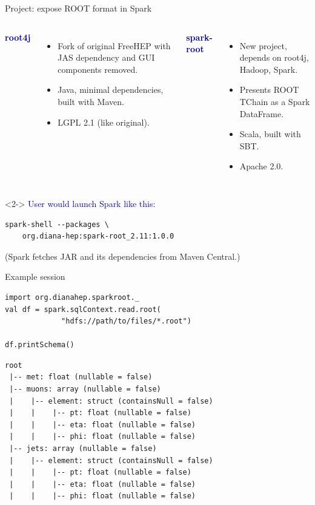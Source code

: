 \documentclass{beamer}
\begin{document}
\begin{frame}[fragile]{Project: expose ROOT format in Spark}
\vspace{0.5 cm}
\begin{columns}[t]
\textcolor{darkblue}{\large \bf root4j}

\vspace{0.1 cm}
\begin{itemize}
\item Fork of original FreeHEP with JAS dependency and GUI components removed.
\item Java, minimal dependencies, built with Maven.
\item LGPL 2.1 (like original).
\end{itemize}

\textcolor{darkblue}{\large \bf spark-root}

\vspace{0.1 cm}
\begin{itemize}
\item New project, depends on root4j, Hadoop, Spark.
\item Presents ROOT TChain as a Spark DataFrame.
\item Scala, built with SBT.
\item Apache 2.0.
\end{itemize}
\end{columns}

\vspace{1 cm}
\begin{uncoverenv}<2->
\textcolor{darkblue}{\large User would launch Spark like this:}

\small
\begin{verbatim}
spark-shell --packages \
    org.diana-hep:spark-root_2.11:1.0.0
\end{verbatim}

\normalsize
(Spark fetches JAR and its dependencies from Maven Central.)
\end{uncoverenv}
\end{frame}

\begin{frame}[fragile]{Example session}
\small
\vspace{0.5 cm}
\begin{verbatim}
import org.dianahep.sparkroot._
val df = spark.sqlContext.read.root(
             "hdfs://path/to/files/*.root")

df.printSchema()
\end{verbatim}
\begin{verbatim}
root
 |-- met: float (nullable = false)
 |-- muons: array (nullable = false)
 |    |-- element: struct (containsNull = false)
 |    |    |-- pt: float (nullable = false)
 |    |    |-- eta: float (nullable = false)
 |    |    |-- phi: float (nullable = false)
 |-- jets: array (nullable = false)
 |    |-- element: struct (containsNull = false)
 |    |    |-- pt: float (nullable = false)
 |    |    |-- eta: float (nullable = false)
 |    |    |-- phi: float (nullable = false)
\end{verbatim}
\end{frame}
\end{document}
